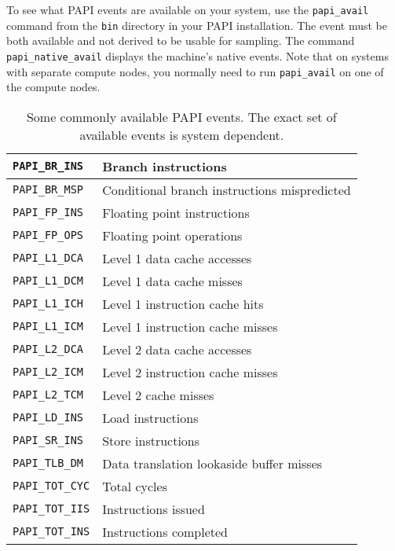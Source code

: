 To see what PAPI events are available on your system, use the
\verb|papi_avail| command from the \verb|bin| directory in your PAPI
installation.  The event must be both available and not derived to be
usable for sampling.  The command \verb|papi_native_avail| displays
the machine's native events.  Note that on systems with separate
compute nodes, you normally need to run \verb|papi_avail| on one of
the compute nodes.

\begin{table}
\begin{center}
\begin{tabular}{|l|l|}
\hline
\verb|PAPI_BR_INS| & Branch instructions \\
\hline
\verb|PAPI_BR_MSP| & Conditional branch instructions mispredicted \\
\hline
\verb|PAPI_FP_INS| & Floating point instructions \\
\hline
\verb|PAPI_FP_OPS| & Floating point operations \\
\hline
\verb|PAPI_L1_DCA| & Level 1 data cache accesses \\
\hline
\verb|PAPI_L1_DCM| & Level 1 data cache misses \\
\hline
\verb|PAPI_L1_ICH| & Level 1 instruction cache hits \\
\hline
\verb|PAPI_L1_ICM| & Level 1 instruction cache misses \\
\hline
\verb|PAPI_L2_DCA| & Level 2 data cache accesses \\
\hline
\verb|PAPI_L2_ICM| & Level 2 instruction cache misses \\
\hline
\verb|PAPI_L2_TCM| & Level 2 cache misses \\
\hline
\verb|PAPI_LD_INS| & Load instructions \\
\hline
\verb|PAPI_SR_INS| & Store instructions \\
\hline
\verb|PAPI_TLB_DM| & Data translation lookaside buffer misses \\
\hline
\verb|PAPI_TOT_CYC| & Total cycles \\
\hline
\verb|PAPI_TOT_IIS| & Instructions issued \\
\hline
\verb|PAPI_TOT_INS| & Instructions completed \\
\hline
\end{tabular}
\end{center}
\caption{Some commonly available PAPI events.
The exact set of available events is system dependent.}
\label{tab:papi-events}
\end{table}

